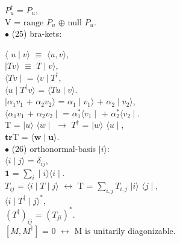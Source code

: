 \documentclass[a4paper, 10pt, onepage]{elegantbook}
\begin{document}
{$P_u^\dagger$ = $P_u$,  \\

V  = $\text{range}$ $P_u$ $\oplus$ $\text{null}$ $P_u$. \\

$\bullet$ (25) bra-kets:

$\langle$ $u \mid v \rangle$ $\equiv$ $\langle { u,v} \rangle$,  \\

$\mid Tv \rangle$ $\equiv$ $T \mid v \rangle$,  \\

$\langle Tv \mid$ = $\langle v \mid T^\dagger$, \\

$\langle u \mid T^\dagger v \rangle$ = $\langle Tu \mid v \rangle$. \\ 

$\mid \alpha_1 v_1$ + $\alpha_2 v_2 \rangle$ = $\alpha_1 \mid v_1 \rangle$ + $\alpha_2 \mid v_2 \rangle$,  \\ 

$\langle \alpha_1 v_1$ + $\alpha_2 v_2 \mid$ = $\alpha_1^* \langle v_1 \mid $ + $\alpha_2^* \langle v_2 \mid $.  \\  

T = $\mid u \rangle$ $\langle w \mid$ $\longrightarrow$ $T^\dagger$ = $\mid w \rangle$ $\langle u \mid$, \\ 

$\mathbf{\textbf{tr}}$T = $\langle \mathbf w \mid \mathbf u \rangle$.  \\

$\bullet$ (26) orthonormal-basis $\mid i \rangle$: \\

$\langle i \mid j \rangle$ = $\delta_{ij}$,  \\

$\mathbf{1}$  = $\sum_i \mid i \rangle \langle i \mid$.  \\

$T_{ij}$ = $\langle i\mid T \mid j \rangle$ $\longleftrightarrow$ T = $\sum_{i,j} T_{i,j}$ $\mid i \rangle$ $\langle j \mid$,  \\

$\langle i \mid T^\dagger \mid j \rangle^*$,  \\ 

$(T^\dagger)_{ij}$ = $(T_{ji})^*$.  \\  

$[M,M^\dagger]$ = 0 $\longleftrightarrow$ $\text{M is unitarily}$ diagonizable.  \\

}
\end{document}
